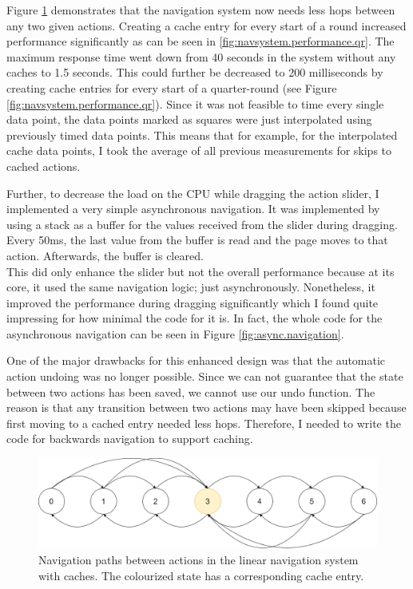 Figure \ref{fig:navsystem.cache.overview} demonstrates that the navigation system now needs less hops between any two given actions. Creating a cache entry for every start of a round increased performance significantly as can be seen in \ref{fig:navsystem.performance.qr}. The maximum response time went down from 40 seconds in the system without any caches to 1.5 seconds. This could further be decreased to 200 milliseconds by creating cache entries for every start of a quarter-round (see Figure \ref{fig:navsystem.performance.qr}). Since it was not feasible to time every single data point, the data points marked as squares were just interpolated using previously timed data points. This means that for example, for the interpolated cache data points, I took the average of all previous measurements for skips to cached actions.

Further, to decrease the load on the CPU while dragging the action slider, I implemented a very simple asynchronous navigation. It was implemented by using a stack as a buffer for the values received from the slider during dragging. Every 50ms, the last value from the buffer is read and the page moves to that action. Afterwards, the buffer is cleared. \\
This did only enhance the slider but not the overall performance because at its core, it used the same navigation logic; just asynchronously. Nonetheless, it improved the performance during dragging significantly which I found quite impressing for how minimal the code for it is. In fact, the whole code for the asynchronous navigation can be seen in Figure \ref{fig:async.navigation}.

One of the major drawbacks for this enhanced design was that the automatic action undoing was no longer possible. Since we can not guarantee that the state between two actions has been saved, we cannot use our undo function. The reason is that any transition between two actions may have been skipped because first moving to a cached entry needed less hops. Therefore, I needed to write the code for backwards navigation to support caching.

\begin{figure}
\centering
\includegraphics[width=\textwidth]{figures/navigationsystem-diagram/navigationsystem-cache-overview-2.png}
\caption[Navigation paths in linear navigation system with caches]{Navigation paths between actions in the linear navigation system with caches. The colourized state has a corresponding cache entry.}
\label{fig:navsystem.cache.overview}
\end{figure}

